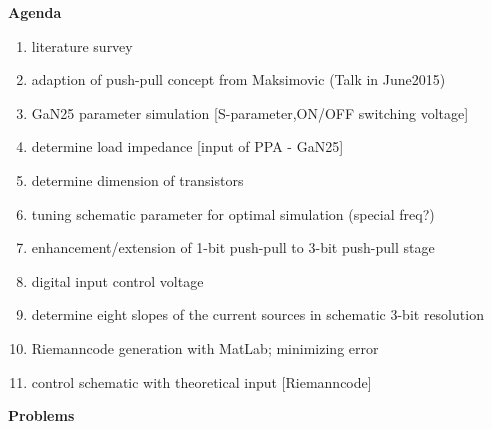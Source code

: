 \textbf{Agenda}
\begin{enumerate}
	\item literature survey
	\item adaption of push-pull concept from Maksimovic (Talk in June2015)
	\item GaN25 parameter simulation [S-parameter,ON/OFF switching voltage]
	\item determine load impedance [input of PPA - GaN25]
	\item determine dimension of transistors
	\item tuning schematic parameter for optimal simulation (special freq?)
	\item enhancement/extension of 1-bit push-pull to 3-bit push-pull stage
	\item digital input control voltage
	\item determine eight slopes of the current sources in schematic 3-bit resolution
	\item Riemanncode generation with MatLab; minimizing error
	\item control schematic with theoretical input [Riemanncode]
\end{enumerate}
\vspace{1cm}
\textbf{Problems}
